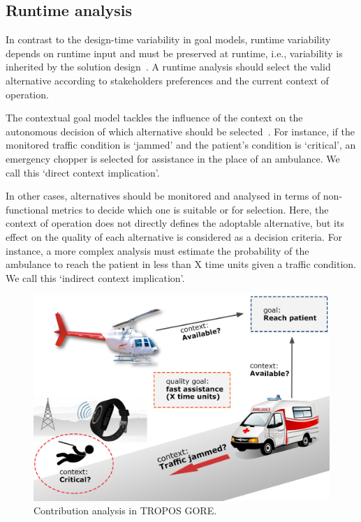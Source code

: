 \subsection{Runtime analysis}

In contrast to the design-time variability in goal models, runtime variability depends on runtime input and must be preserved at runtime, i.e., variability is inherited by the solution design~\cite{Yu:2008}. A runtime analysis should select the valid alternative according to stakeholders preferences and the current context of operation.

The contextual goal model tackles the influence of the context on the autonomous decision of which alternative should be selected~\cite{Ali:2010}. For instance, if the monitored traffic condition is `jammed' and the patient's condition is `critical', an emergency chopper is selected for assistance in the place of an ambulance. We call this  `direct context implication'.

In other cases, alternatives should be monitored and analysed in terms of non-functional metrics to decide which one is suitable or for selection. Here, the context of operation does not directly defines the adoptable alternative, but its effect on the quality of each alternative is considered as a decision criteria. For instance, a more complex analysis must estimate the probability of the ambulance to reach the patient in less than X time units given a traffic condition. We call this `indirect context implication'. 


\begin{figure}[h!]
\centering
\includegraphics[width=1\textwidth]{imgs/RUNTIME_ANALYSIS.png}
\caption{Contribution analysis in TROPOS GORE.}
\label{fig:RUNTIME_ANALYSIS}
\end{figure}

